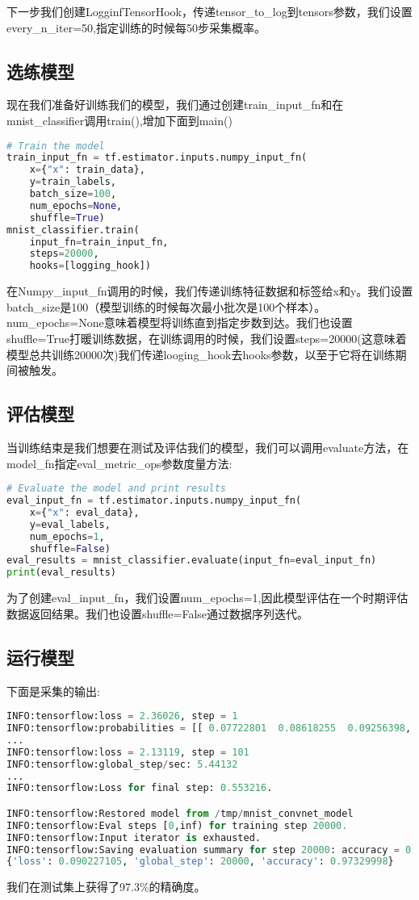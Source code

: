 下一步我们创建LogginfTensorHook，传递tensor\_to\_log到tensors参数，我们设置every\_n\_iter=50,指定训练的时候每50步采集概率。
\subsection{选练模型}
现在我们准备好训练我们的模型，我们通过创建train\_input\_fn和在mnist\_classifier调用train(),增加下面到main()
\begin{lstlisting}[language=Python]
# Train the model
train_input_fn = tf.estimator.inputs.numpy_input_fn(
    x={"x": train_data},
    y=train_labels,
    batch_size=100,
    num_epochs=None,
    shuffle=True)
mnist_classifier.train(
    input_fn=train_input_fn,
    steps=20000,
    hooks=[logging_hook])
\end{lstlisting}
在Numpy\_input\_fn调用的时候，我们传递训练特征数据和标签给x和y。我们设置batch\_size是100（模型训练的时候每次最小批次是100个样本）。num\_epochs=None意味着模型将训练直到指定步数到达。我们也设置shuffle=True打暖训练数据，在训练调用的时候，我们设置steps=20000(这意味着模型总共训练20000次)我们传递looging\_hook去hooks参数，以至于它将在训练期间被触发。
\subsection{评估模型}
当训练结束是我们想要在测试及评估我们的模型，我们可以调用evaluate方法，在model\_fn指定eval\_metric\_ops参数度量方法:
\begin{lstlisting}[language=Python]
# Evaluate the model and print results
eval_input_fn = tf.estimator.inputs.numpy_input_fn(
    x={"x": eval_data},
    y=eval_labels,
    num_epochs=1,
    shuffle=False)
eval_results = mnist_classifier.evaluate(input_fn=eval_input_fn)
print(eval_results)
\end{lstlisting}
为了创建eval\_input\_fn，我们设置num\_epochs=1,因此模型评估在一个时期评估数据返回结果。我们也设置shuffle=False通过数据序列迭代。
\subsection{运行模型}
下面是采集的输出:
\begin{lstlisting}[language=Python]
INFO:tensorflow:loss = 2.36026, step = 1
INFO:tensorflow:probabilities = [[ 0.07722801  0.08618255  0.09256398, ...]]
...
INFO:tensorflow:loss = 2.13119, step = 101
INFO:tensorflow:global_step/sec: 5.44132
...
INFO:tensorflow:Loss for final step: 0.553216.

INFO:tensorflow:Restored model from /tmp/mnist_convnet_model
INFO:tensorflow:Eval steps [0,inf) for training step 20000.
INFO:tensorflow:Input iterator is exhausted.
INFO:tensorflow:Saving evaluation summary for step 20000: accuracy = 0.9733, loss = 0.0902271
{'loss': 0.090227105, 'global_step': 20000, 'accuracy': 0.97329998}
\end{lstlisting}
我们在测试集上获得了97.3\%的精确度。
